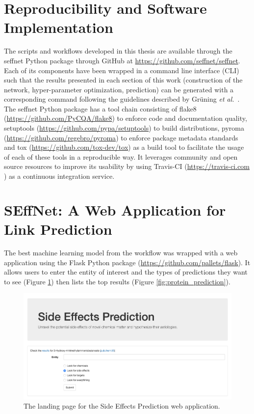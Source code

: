 \section{Reproducibility and Software Implementation}
The scripts and workflows developed in this thesis are available through the seffnet Python package through GitHub at \url{https://github.com/seffnet/seffnet}.
Each of its components have been wrapped in a command line interface (CLI) such that the results presented in each section of this work (construction of the network, hyper-parameter optimization, prediction) can be generated with a corresponding command following the guidelines described by Grüning \textit{et al.}~\cite{gruning_software_2019}.
The seffnet Python package has a tool chain consisting of flake8 (\url{https://github.com/PyCQA/flake8}) to enforce code and documentation quality, setuptools (\url{https://github.com/pypa/setuptools}) to build distributions, pyroma (\url{https://github.com/regebro/pyroma}) to enforce package metadata standards and tox (\url{https://github.com/tox-dev/tox}) as a build tool to facilitate the usage of each of these tools in a reproducible way.
It leverages community and open source resources to improve its usability by using Travis-CI (\url{https://travis-ci.com} ) as a continuous integration service.

\section{SEffNet: A Web Application for Link Prediction}
The best machine learning model from the workflow was wrapped with a web application using the Flask Python package (\url{https://github.com/pallets/flask}).
It allows users to enter the entity of interest and the types of predictions they want to see (Figure \ref{fig:web_page}) then lists the top results (Figure \ref{fig:protein_prediction}).

\begin{figure}[h!]
    \centering
    \includegraphics[scale=0.35]
    {figures/web_page.png}
    \caption{\label{fig:web_page} The landing page for the Side Effects Prediction web application.}
\end{figure}

